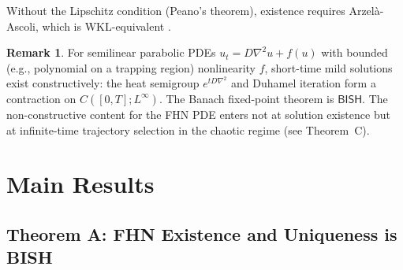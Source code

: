 \documentclass[11pt,a4paper]{article}
\theoremstyle{plain}
\theoremstyle{definition}
\newtheorem{remark}[theorem]{Remark}
\newcommand{\BISH}{\textsf{BISH}}
\begin{document}
Without the Lipschitz condition (Peano's theorem), existence requires Arzel\`a-Ascoli, which is WKL-equivalent \cite{brattka2024}.

\begin{remark}
For semilinear parabolic PDEs $u_t = D\nabla^2 u + f(u)$ with bounded (e.g., polynomial on a trapping region) nonlinearity $f$, short-time mild solutions exist constructively: the heat semigroup $e^{tD\nabla^2}$ and Duhamel iteration form a contraction on $C([0,T]; L^\infty)$.  The Banach fixed-point theorem is $\BISH$.  The non-constructive content for the FHN PDE enters not at solution existence but at infinite-time trajectory selection in the chaotic regime (see Theorem~C).
\end{remark}

\section{Main Results}\label{sec:results}

\subsection{Theorem A: FHN Existence and Uniqueness is BISH}
\end{document}
